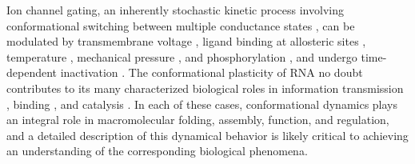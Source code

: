 Ion channel gating, an inherently stochastic kinetic process involving conformational switching between multiple conductance states \cite{mannuzzu:science:1996,cordero-morales:nsmb:2006:gating-of-KcsA}, can be modulated by transmembrane voltage \cite{bezanilla:physiol-rev:2000,cordero-morales:nsmb:2006:KcsA-voltage-gating}, ligand binding at allosteric sites \cite{dably-brown:curr-topics-med-chem:2006:Kv7-modulators}, temperature \cite{tominaga:jneurobiol:2004:thermosensation}, mechanical pressure \cite{perozo:nrmcb:2006:gating-mechanosensitive-channels}, and phosphorylation \cite{levitan:annu-rev-physiol:1994}, and undergo time-dependent inactivation \cite{demo:neuron:1991}.
The conformational plasticity of RNA no doubt contributes to its many characterized biological roles in information transmission \cite{ogle:science:2001,sanbonmatsu:biochimie:2006}, binding \cite{ha:pnas:1999}, and catalysis \cite{zhuang:science:2002:structural-dynamics-ribozyme-function,ke:nature:2004:ribozyme-catalysis-conformational-switch}.
In each of these cases, conformational dynamics plays an integral role in macromolecular folding, assembly, function, and regulation, and a detailed description of this dynamical behavior is likely critical to achieving an understanding of the corresponding biological phenomena.

